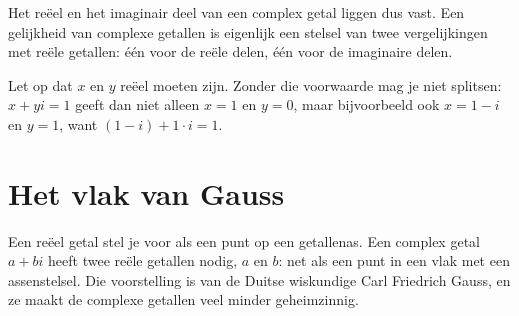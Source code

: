 Het reëel en het imaginair deel van een complex getal liggen dus vast. Een gelijkheid van complexe getallen is eigenlijk een stelsel van twee vergelijkingen met reële getallen: één voor de reële delen, één voor de imaginaire delen.


Let op dat $x$ en $y$ reëel moeten zijn. Zonder die voorwaarde mag je niet splitsen: $x + yi = 1$ geeft dan niet alleen $x = 1$ en $y = 0$, maar bijvoorbeeld ook $x = 1 - i$ en $y = 1$, want $(1 - i) + 1 \cdot i = 1$.


\begin{oefeningen}
\end{oefeningen}

\section{Het vlak van Gauss}

Een reëel getal stel je voor als een punt op een getallenas. Een complex getal $a + bi$ heeft twee reële getallen nodig, $a$ en $b$: net als een punt in een vlak met een assenstelsel. Die voorstelling is van de Duitse wiskundige Carl Friedrich Gauss, en ze maakt de complexe getallen veel minder geheimzinnig.


